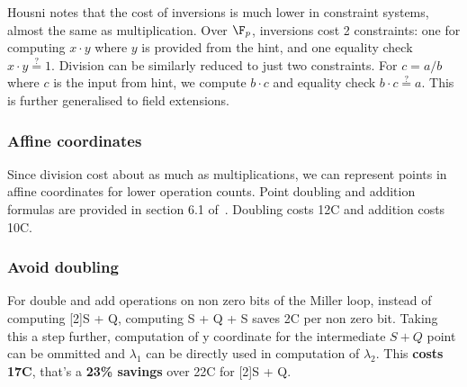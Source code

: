 Housni notes that the cost of inversions is much lower in constraint systems, almost the same as multiplication. Over $\F_p$, inversions cost 2 constraints: one for computing $x \cdot y$ where $y$ is provided from the hint, and one equality check $x \cdot y \stackrel{?}{=} 1$. Division can be similarly reduced to just two constraints. For $c = a/b$ where $c$ is the input from hint, we compute $b \cdot c$ and equality check $b \cdot c \stackrel{?}{=} a$. This is further generalised to field extensions.



\subsubsection{Affine coordinates}

Since division cost about as much as multiplications, we can represent points in affine coordinates for lower operation counts. Point doubling and addition formulas are provided in section 6.1 of~\cite{PR1CS22}. Doubling costs 12C and addition costs 10C.

\subsubsection{Avoid doubling}

For double and add operations on non zero bits of the Miller loop, instead of computing [2]S + Q, computing S + Q + S saves 2C per non zero bit.
Taking this a step further, computation of y coordinate for the intermediate $S + Q$ point can be ommitted and $\lambda_1$ can be directly used in computation of $\lambda_2$. This \textbf{costs 17C}, that's a \textbf{23\% savings} over 22C for [2]S + Q.

